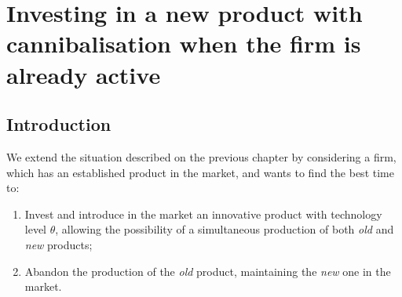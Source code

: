 
\chapter{Investing in a new product with cannibalisation when the firm is already active}
\label{chapter:3}



\section{Introduction}
\label{section:3_intro}




We extend the situation described on the previous chapter by considering a firm, which has an established product in the market, and wants to find the best time to:
\begin{enumerate}
	\item Invest and introduce in the market an innovative product with technology level $\theta$, allowing the possibility of a simultaneous production of both \textit{old} and \textit{new} products;
	\item Abandon the production of the \textit{old} product, maintaining the \textit{new} one in the market.
\end{enumerate}

